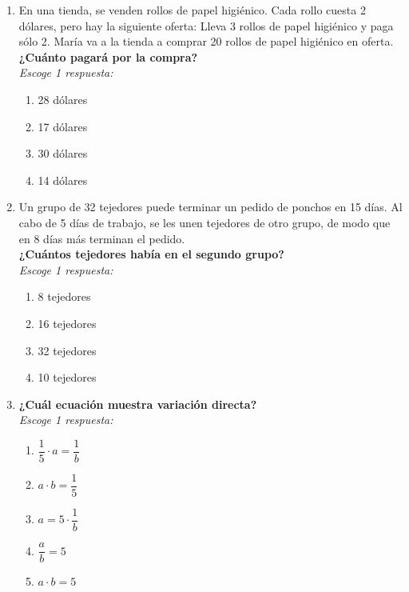 \documentclass[11pt]{book}
\begin{document}
\begin{enumerate}[start=1]
  \item En una tienda, se venden rollos de papel higiénico. Cada rollo cuesta 2 dólares, pero hay la siguiente oferta:
        Lleva 3 rollos de papel higiénico y paga s\'olo 2.
        María va a la tienda a comprar 20 rollos de papel higiénico en oferta.\\
        \textbf{¿Cuánto pagará por la compra?}\\
        \emph{Escoge 1 respuesta:}\\
        \begin{enumerate}
          \item 28 dólares
          \item 17 dólares
          \item 30 dólares
          \item 14 dólares
        \end{enumerate}

  \item Un grupo de 32 tejedores puede terminar un pedido de ponchos en 15 días. Al cabo de 5 días de trabajo, se les unen tejedores de otro grupo, de modo que en 8 días más terminan el pedido.\\
        \textbf{¿Cuántos tejedores había en el segundo grupo?}\\
        \emph{Escoge 1 respuesta:}\\
        \begin{enumerate}
          \item 8 tejedores
          \item 16 tejedores
          \item 32 tejedores
          \item 10 tejedores
        \end{enumerate}

  \item \textbf{¿Cuál ecuación muestra variación directa?}\\
        \emph{Escoge 1 respuesta:}\\
        \begin{enumerate}
          \item $\dfrac{1}{5}\cdot a=\dfrac{1}{b}$
          \item $a\cdot b=\dfrac{1}{5}$
          \item $a=5\cdot \dfrac{1}{b}$
          \item $\dfrac{a}{b}=5$
          \item $a\cdot b=5$
        \end{enumerate}


\end{enumerate}
\end{document}
